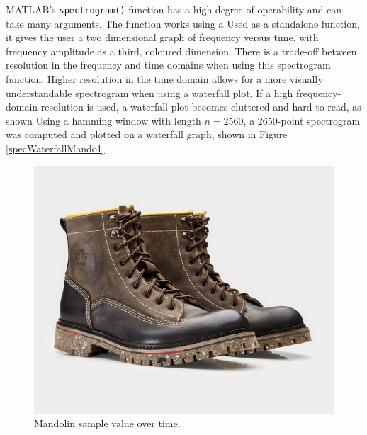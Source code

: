 \documentclass{article}
\begin{document}
        MATLAB's \texttt{spectrogram()} function has a high degree of operability and can take many arguments.
        The function works using a 
        Used as a standalone function, it gives the user a two dimensional graph of frequency versus time, with frequency amplitude as a third, coloured dimension.
        There is a trade-off between resolution in the frequency and time domains when using this spectrogram function.
        Higher resolution in the time domain allows for a more visually understandable spectrogram when using a waterfall plot.
        If a high frequency-domain resolution is used, a waterfall plot becomes cluttered and hard to read, as shown 
        Using a hamming window with length $n = 2560$, a 2650-point spectrogram was computed and plotted on a waterfall graph, shown in Figure \ref{specWaterfallMando1}.
        \begin{figure}[h]
            \includegraphics[scale=0.25]{images/placeholder.png}%
            \centering
            \caption{Mandolin sample value over time.}
            \label{specMando1}
        \end{figure}
\end{document}
